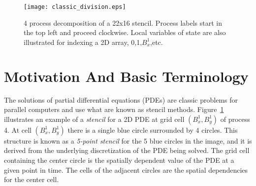 
\newcommand{\nxl}{\textup{\textsf{nxl}}} %
\newcommand{\nyl}{\textup{\textsf{nyl}}} %
\newcommand{\tm}{ \text{$t_{max}$} }
\newcommand{\av}{ \mathbf{a} }
\newcommand{\uv}{ \mathbf{u} }
\newcommand{\bv}{ \mathbf{b} }
\newcommand{\pv}{ \mathbf{p} }
\newcommand{\orig} {\mathcal{O}}

\newcommand{\rnt}{ R_{-\theta} }
\newcommand{\rt}{ R_{\theta} }

\newcommand{\la}{\leftarrow} %
\newcommand{\ra}{\rightarrow} %

\newcommand{\dx}{\textsf{dx}}
\newcommand{\dy}{\textsf{dy}}

\newcommand{\data}{\textup{\textsf{data}}}
\newcommand{\psendf}{\textit{postSend}}
\newcommand{\precvf}{\textit{postRecv}}
\newcommand{\psend}[2]{\psendf(#1,#2)}
\newcommand{\precv}[2]{\precvf(#1,#2)}
\newcommand{\pid}{\textup{\textsf{pid}}} %


\begin{figure}[t]
  \centering
  \texttt{[image: classic\_division.eps]}
  \caption{4 process decomposition of a 22x16 stencil.  Process labels start in the top left and proceed clockwise.  Local
  variables of state are also illustrated for indexing a 2D array, 0,1,$B_x^1$,etc.}
  \label{fig:basic}
\end{figure}

\section{Motivation And Basic Terminology}\label{sec:problem_statement}

The solutions of partial differential equations (PDEs) are classic problems for parallel
computers and use
what are known as stencil methods.
Figure~\ref{fig:basic} illustrates an example of a {\it stencil}
for a 2D PDE at grid cell $(B_x^1,B_y^1)$ of process 4.
At cell $(B_x^1,B_y^1)$ there is a single blue circle surrounded by 4 circles.
This structure is known as a {\it 5-point stencil} for the 5 blue circles in the image,
and it is derived from the underlying discretization of the PDE being solved.
The grid cell containing the
center circle is the spatially dependent value of the PDE at a given point in
 time.
The cells of the adjacent circles are the
spatial dependencies for the center cell.

